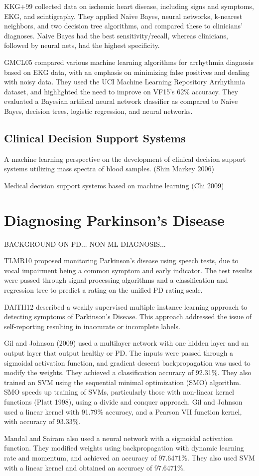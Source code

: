 \documentclass{article}
\begin{document}
KKG+99 collected data on ischemic heart disease, including signs and
symptoms, EKG, and scintigraphy. They applied Naive Bayes, neural networks,
k-nearest neighbors, and two decision tree algorithms, and compared
these to clinicians’ diagnoses. Naive Bayes had the best
sensitivity/recall, whereas clinicians, followed by neural nets, had
the highest specificity.

GMCL05 compared various machine learning algorithms for arrhythmia
diagnosis based on EKG data, with an emphasis on minimizing false
positives and dealing with noisy data. They used the UCI Machine
Learning Repository Arrhythmia dataset, and highlighted the need to
improve on VF15’s 62\% accuracy. They evaluated a Bayesian artifical neural network classifier as compared to Naive Bayes, decision trees, logistic regression, and neural networks.

\subsection{Clinical Decision Support Systems}
A machine learning perspective on the development of clinical decision
support systems utilizing mass spectra of blood samples. (Shin Markey 2006)

Medical decision support systems based on machine learning (Chi 2009)

\section{Diagnosing Parkinson's Disease}
BACKGROUND ON PD...
NON ML DIAGNOSIS...

TLMR10 proposed monitoring Parkinson’s disease using speech tests, due to
vocal impairment being a common symptom and early indicator. The
test results were passed through signal processing algorithms and a
classification and regression tree to predict a rating on the unified
PD rating scale.

DAlTH12 described a weakly supervised multiple instance learning
approach to detecting symptoms of Parkinson’s Disease. This approach
addressed the issue of self-reporting resulting in inaccurate or incomplete labels.

Gil and Johnson (2009) used a multilayer network with one hidden layer
and an output layer that output healthy or PD. The inputs were passed
through a sigmoidal activation function, and gradient descent
backpropagation was used to modify the weights. They achieved a
classification accuracy of 92.31\%.
They also trained an SVM using the sequential minimal
optimization (SMO) algorithm. SMO speeds up training
of SVMs, particularly those with non-linear kernel functions (Platt
1998), using a divide and conquer approach. Gil and Johnson used a
linear kernel with 91.79\% accuracy, and a Pearson VII function
kernel, with accuracy of 93.33\%.

Mandal and Sairam also used a neural network with a sigmoidal activation function. They modified weights using backpropagation with dynamic
learning rate and momentum, and achieved an accuracy of 97.6471\%.
They also used SVM with a linear kernel and obtained an
accuracy of 97.6471\%.
\end{document}
